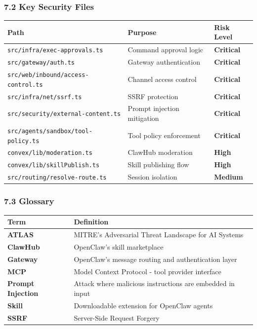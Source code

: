 \subsubsection{7.2 Key Security Files}



\begin{table}[h]
\centering
\small
\begin{tabular}{|l|l|l|}
\hline
Path & Purpose & Risk Level \\
\hline
\texttt{src/infra/exec-approvals.ts} & Command approval logic & \textbf{Critical} \\
\hline
\texttt{src/gateway/auth.ts} & Gateway authentication & \textbf{Critical} \\
\hline
\texttt{src/web/inbound/access-control.ts} & Channel access control & \textbf{Critical} \\
\hline
\texttt{src/infra/net/ssrf.ts} & SSRF protection & \textbf{Critical} \\
\hline
\texttt{src/security/external-content.ts} & Prompt injection mitigation & \textbf{Critical} \\
\hline
\texttt{src/agents/sandbox/tool-policy.ts} & Tool policy enforcement & \textbf{Critical} \\
\hline
\texttt{convex/lib/moderation.ts} & ClawHub moderation & \textbf{High} \\
\hline
\texttt{convex/lib/skillPublish.ts} & Skill publishing flow & \textbf{High} \\
\hline
\texttt{src/routing/resolve-route.ts} & Session isolation & \textbf{Medium} \\
\hline
\end{tabular}
\end{table}



\subsubsection{7.3 Glossary}



\begin{table}[h]
\centering
\small
\begin{tabular}{|l|l|}
\hline
Term & Definition \\
\hline
\textbf{ATLAS} & MITRE's Adversarial Threat Landscape for AI Systems \\
\hline
\textbf{ClawHub} & OpenClaw's skill marketplace \\
\hline
\textbf{Gateway} & OpenClaw's message routing and authentication layer \\
\hline
\textbf{MCP} & Model Context Protocol - tool provider interface \\
\hline
\textbf{Prompt Injection} & Attack where malicious instructions are embedded in input \\
\hline
\textbf{Skill} & Downloadable extension for OpenClaw agents \\
\hline
\textbf{SSRF} & Server-Side Request Forgery \\
\hline
\end{tabular}
\end{table}



